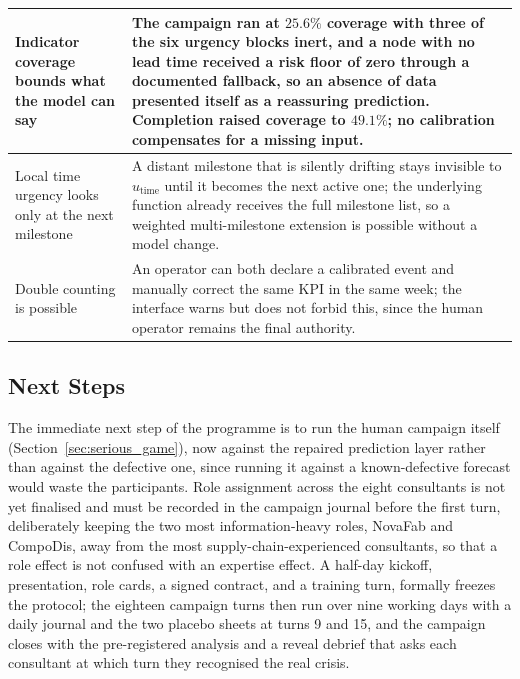 \begin{table}[H]
\begin{tabularx}{\linewidth}{>{\raggedright\arraybackslash}p{4.2cm} X}
\midrule
Indicator coverage bounds what the model can say & The campaign ran at $25.6\%$ coverage with three of the six urgency blocks inert, and a node with no lead time received a risk floor of zero through a documented fallback, so an absence of data presented itself as a reassuring prediction. Completion raised coverage to $49.1\%$; no calibration compensates for a missing input. \\[3pt]
\midrule
Local time urgency looks only at the next milestone & A distant milestone that is silently drifting stays invisible to $u_{\text{time}}$ until it becomes the next active one; the underlying function already receives the full milestone list, so a weighted multi-milestone extension is possible without a model change. \\[3pt]
\midrule
Double counting is possible & An operator can both declare a calibrated event and manually correct the same KPI in the same week; the interface warns but does not forbid this, since the human operator remains the final authority. \\
\bottomrule
\end{tabularx}
\end{table}

\subsection{Next Steps}

The immediate next step of the programme is to run the human campaign itself (Section~\ref{sec:serious_game}), now against the repaired prediction layer rather than against the defective one, since running it against a known-defective forecast would waste the participants. Role assignment across the eight consultants is not yet finalised and must be recorded in the campaign journal before the first turn, deliberately keeping the two most information-heavy roles, NovaFab and CompoDis, away from the most supply-chain-experienced consultants, so that a role effect is not confused with an expertise effect. A half-day kickoff, presentation, role cards, a signed contract, and a training turn, formally freezes the protocol; the eighteen campaign turns then run over nine working days with a daily journal and the two placebo sheets at turns 9 and 15, and the campaign closes with the pre-registered analysis and a reveal debrief that asks each consultant at which turn they recognised the real crisis.

